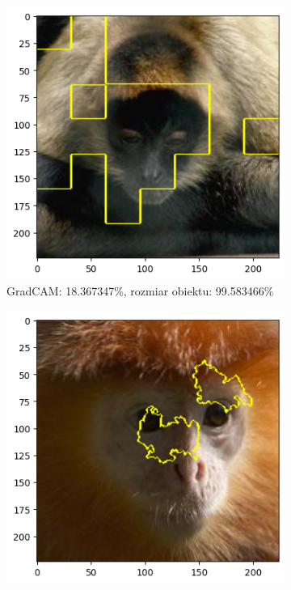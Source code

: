 \begin{figure}[h]
	\centering
	\begin{subfigure}[b]{0.3\textwidth}
		\includegraphics[width=.9\textwidth]{img/examples/appendix/n02493793_32964_gradcam}
		\caption{GradCAM: 18.367347\%, rozmiar obiektu: 99.583466\%}
	\end{subfigure}
	\begin{subfigure}[b]{0.3\textwidth}
		\includegraphics[width=.9\textwidth]{img/examples/appendix/n02488291_05090_lime}

\end{subfigure}
\end{figure}
